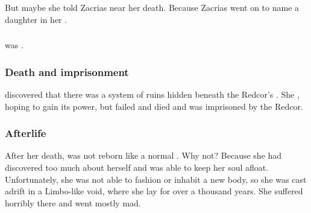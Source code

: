 But maybe she told Zacrias near her death. 
Because Zacrias went on to name a daughter \quo{\Delphine} in her \honour. 





\subsubsection{\Apotheosis}
\Belzir was . 





\subsubsection{Death and imprisonment}
\Belzir discovered that there was a system of \bane ruins hidden beneath the Redcor's \TopazChateau.
She , hoping to gain its power, but failed and died and was imprisoned by the Redcor. 





\subsubsection{Afterlife}
After her death, \Belzir{} was not reborn like a normal \Malach. 
Why not? 
Because she had discovered too much about herself and was able to keep her soul afloat. 
Unfortunately, she was not able to fashion or inhabit a new body, so she was cast adrift in a Limbo-like void, where she lay for over a thousand years. 
She suffered horribly there and went mostly mad.

